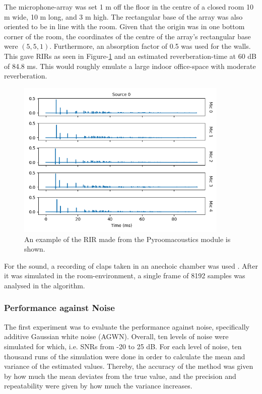 \documentclass[notitlepage]{report}
\begin{document}
The microphone-array was set 1 \si{m} off the floor in the centre of a closed room 10 \si{m} wide, 10 \si{m} long, and 3 \si{m} high. The rectangular base of the array was also oriented to be in line with the room. Given that the origin was in one bottom corner of the room, the coordinates of the centre of the array's rectangular base were $(5,5,1)$. Furthermore, an absorption factor of 0.5 was used for the walls. This gave RIRs as seen in Figure-\ref{fig:pyramid_robot_noise_rir} and an estimated reverberation-time at 60 \si{dB} of 84.8 \si{ms}. This would roughly emulate a large indoor office-space with moderate reverberation.

\begin{figure}[H]
\includegraphics[width=0.9\textwidth]{../Python/pyramid_robot/noise/rir.png}
\centering
\caption{An example of the RIR made from the Pyroomacoustics module is shown.}
\label{fig:pyramid_robot_noise_rir}
\centering
\end{figure}

For the sound, a recording of claps taken in an anechoic chamber was used \cite{noauthor_handclaps_2005}. After it was simulated in the room-environment, a single frame of 8192 samples was analysed in the algorithm.

\subsubsection{Performance against Noise}

The first experiment was to evaluate the performance against noise, specifically additive Gaussian white noise (AGWN). Overall, ten levels of noise were simulated for which, i.e. SNRs from -20 to 25 \si{dB}. For each level of noise, ten thousand runs of the simulation were done in order to calculate the mean and variance of the estimated values. Thereby, the accuracy of the method was given by how much the mean deviates from the true value, and the precision and repeatability were given by how much the variance increases.
\end{document}
